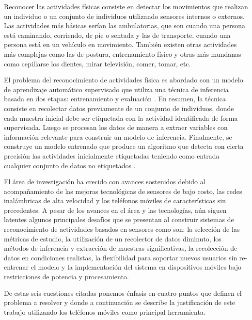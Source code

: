Reconocer las actividades físicas consiste en detectar los movimientos
que realizan un individuo o un conjunto de individuos utilizando sensores
internos o externos. Las actividades más básicas serían las ambulatorias,
que son cuando una persona está caminando, corriendo, de pie o sentada
y las de transporte, cuando una persona está en un vehículo en movimiento.
También existen otras actividades más complejas como las de postura,
entrenamiento físico y otras más mundanas como cepillarse los dientes,
mirar televisión, comer, tomar, etc. \cite{LaraLabrador2013}

El problema del reconocimiento de actividades física es abordado con
un modelo de aprendizaje automático supervisado que utiliza una técnica
de inferencia basada en dos etapas: entrenamiento y evaluación \cite{LaraLabrador2013}
\cite{Kwapisz2011}. En resumen, la técnica consiste en recolectar
datos previamente de un conjunto de individuos, donde cada muestra
inicial debe ser etiquetada con la actividad identificada de forma
supervisada. Luego se procesan los datos de manera a extraer variables
con información relevante para construir un modelo de inferencia.
Finalmente, se construye un modelo entrenado que produce un algoritmo
que detecta con cierta precisión las actividades inicialmente etiquetadas
teniendo como entrada cualquier conjunto de datos no etiquetados \cite{Bao2004}.

El área de investigación ha crecido con avances sostenidos debido
al acompañamiento de las mejoras tecnológicas de sensores de bajo
costo, las redes inalámbricas de alta velocidad y los teléfonos móviles
de características sin precedentes\cite{chen2012sensor}. A pesar
de los avances en el área y las tecnologías, aún siguen latentes algunos
principales desafíos que se presentan al construir sistemas de reconocimiento
de actividades basados en sensores como son: la selección de las métricas
de estudio, la utilización de un recolector de datos diminuto, los
métodos de inferencia y extracción de muestras significativas, la
recolección de datos en condiciones realistas, la flexibilidad para
soportar nuevos usuarios sin re-entrenar el modelo y la implementación
del sistema en dispositivos móviles bajo restricciones de potencia
y procesamiento\cite{LaraLabrador2013}. 

De estas seis cuestiones citadas ponemos énfasis en cuatro puntos
que definen el problema a resolver y donde a continuación se describe
la justificación de este trabajo utilizando los teléfonos móviles
como principal herramienta.

